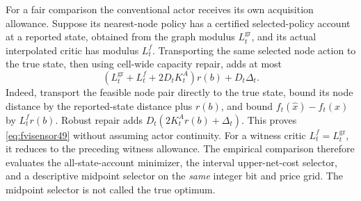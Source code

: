 For a fair comparison the conventional actor receives its own acquisition allowance. Suppose its nearest-node policy has a certified selected-policy account at a reported state, obtained from the graph modulus $L_t^{\mathrm{gr}}$, and its actual interpolated critic has modulus $L_t^f$. Transporting the same selected node action to the true state, then using cell-wide capacity repair, adds at most
\begin{equation}\label{eq:fvisensor49}
 (L_t^{\mathrm{gr}}+L_t^f+2D_tK_t^A)r(b)+D_t\Delta_t.
\end{equation}
Indeed, transport the feasible node pair directly to the true state, bound its node distance by the reported-state distance plus $r(b)$, and bound $f_t(\widehat x)-f_t(x)$ by $L_t^fr(b)$. Robust repair adds $D_t(2K_t^Ar(b)+\Delta_t)$. This proves \eqref{eq:fvisensor49} without assuming actor continuity. For a witness critic $L_t^f=L_t^{\mathrm{gr}}$, it reduces to the preceding witness allowance. The empirical comparison therefore evaluates the all-state-account minimizer, the interval upper-net-cost selector, and a descriptive midpoint selector on the \emph{same} integer bit and price grid. The midpoint selector is not called the true optimum.

